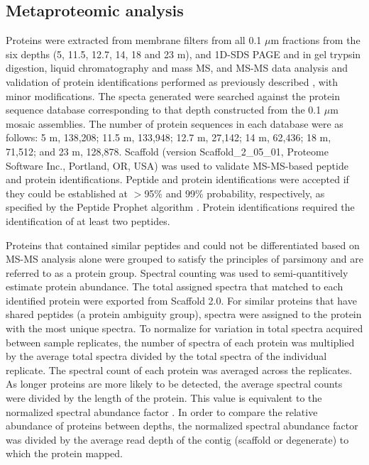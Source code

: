 \subsection{Metaproteomic analysis}
Proteins were extracted from membrane filters from all 0.1 $\mu$m fractions from the six depths (5, 11.5, 12.7, 14, 18 and 23 m), and \ac{1D-SDS PAGE} and in gel trypsin digestion, liquid chromatography and mass \ac{MS}, and \ac{MS-MS} data analysis and validation of protein identifications performed as previously described \cite{Ng2010a}, with minor modifications.
The specta generated were searched against the protein sequence database corresponding to that depth constructed from the 0.1 $\mu$m mosaic assemblies. 
The number of protein sequences in each database were as follows: 5 m, 138,208; 11.5 m, 133,948; 12.7 m, 27,142; 14 m, 62,436; 18 m, 71,512; and 23 m, 128,878. 
Scaffold (version Scaffold\_2\_05\_01, Proteome Software Inc., Portland, OR, USA) was used to validate \ac{MS-MS}-based peptide and protein identifications. 
Peptide and protein identifications were accepted if they could be established at $>$95\% and 99\% probability, respectively, as specified by the Peptide Prophet algorithm \cite{Keller2002}. 
Protein identifications required the identification of at least two peptides.
 
Proteins that contained similar peptides and could not be differentiated based on \ac{MS-MS} analysis alone were grouped to satisfy the principles of parsimony and are referred to as a protein group. 
Spectral counting was used to semi-quantitively estimate protein abundance. 
The total assigned spectra that matched to each identified protein were exported from Scaffold 2.0. 
For similar proteins that have shared peptides (a protein ambiguity group), spectra were assigned to the protein with the most unique spectra. 
To normalize for variation in total spectra acquired between sample replicates, the number of spectra of each protein was multiplied by the average total spectra divided by the total spectra of the individual replicate. 
The spectral count of each protein was averaged across the replicates. 
As longer proteins are more likely to be detected, the average spectral counts were divided by the length of the protein. 
This value is equivalent to the normalized spectral abundance factor \cite{Florens2006, Zybailov2006}. 
In order to compare the relative abundance of proteins between depths, the normalized spectral abundance factor was divided by the average read depth of the contig (scaffold or degenerate) to which the protein mapped. 

